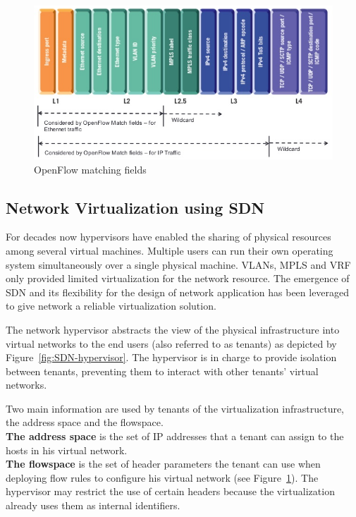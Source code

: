 \begin{figure}[h]
    \centering
    \includegraphics[scale=0.7]{figures/openflow-matchfields.png}
    \caption{OpenFlow matching fields~\cite{openflow-matchfields}}
    \label{fig:matching-fields}
\end{figure}

\subsection{Network Virtualization using SDN}
\label{def:netvirt}

For decades now hypervisors have enabled the sharing of physical resources among several virtual machines.
Multiple users can run their own operating system simultaneously over a single physical machine.
VLANs, MPLS and VRF only provided limited virtualization for the network resource. The emergence of SDN and its flexibility for the design of network application has been leveraged to give network a reliable virtualization solution.

The network hypervisor abstracts the view of the physical infrastructure into virtual networks to the end users (also referred to as tenants) as depicted by Figure~\ref{fig:SDN-hypervisor}.
The hypervisor is in charge to provide isolation between tenants, preventing them to interact with other tenants' virtual networks.

Two main information are used by tenants of the virtualization infrastructure, the address space and the flowspace.\\
\textbf{The address space} is the set of IP addresses that a tenant can assign to the hosts in his virtual network.\\
\textbf{The flowspace} is the set of header parameters the tenant can use when deploying flow rules to configure his virtual network (see Figure~\ref{fig:matching-fields}). The hypervisor may restrict the use of certain headers because the virtualization already uses them as internal identifiers.

